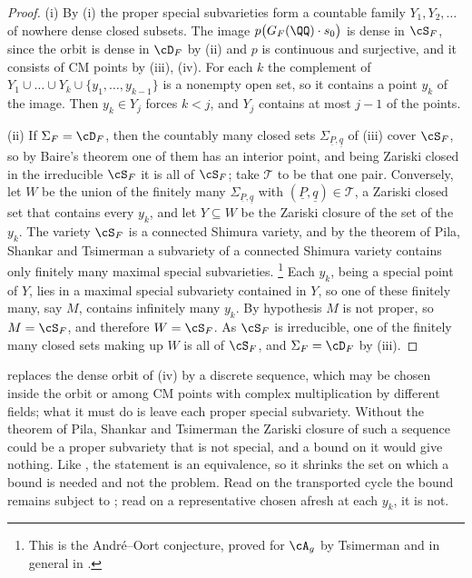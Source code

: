 \begin{proof}
(i) By (i) the proper special subvarieties form a
countable family $Y_{1},Y_{2},\dots$ of nowhere dense closed subsets. The
image $p\bigl(G_{F}(\QQ)\cdot s_{0}\bigr)$ is dense in $\cS_{F}$, since the
orbit is dense in $\cD_{F}$ by (ii) and $p$ is
continuous and surjective, and it consists of CM points by
(iii), (iv). For each $k$ the complement of
$Y_{1}\cup\dots\cup Y_{k}\cup\{y_{1},\dots,y_{k-1}\}$ is a nonempty open set,
so it contains a point $y_{k}$ of the image. Then $y_{k}\in Y_{j}$ forces
$k<j$, and $Y_{j}$ contains at most $j-1$ of the points.

(ii) If $\Sigma_{F}=\cD_{F}$, then the countably many closed sets
$\Sigma_{\underline{P},\underline{q}}$ of (iii) cover
$\cS_{F}$, so by Baire's theorem one of them has an interior point, and being
Zariski closed in the irreducible $\cS_{F}$ it is all of $\cS_{F}$; take
$\mathcal{T}$ to be that one pair. Conversely, let $W$ be the union of the
finitely many $\Sigma_{\underline{P},\underline{q}}$ with
$(\underline{P},\underline{q})\in\mathcal{T}$, a Zariski closed set that
contains every $y_{k}$, and let $Y\subseteq W$ be the Zariski closure of the
set of the $y_{k}$. The variety $\cS_{F}$ is a connected Shimura variety,
and by the theorem of Pila, Shankar and Tsimerman
\cite[Theorem~1.1]{PST} a subvariety of a connected Shimura variety contains
only finitely many maximal special subvarieties.%
\footnote{This is the Andr\'e--Oort conjecture, proved for $\cA_{g}$ by
Tsimerman \cite{Tsi18} and in general in \cite{PST}.}
Each $y_{k}$, being a special point of $Y$, lies in a maximal special
subvariety contained in $Y$, so one of these finitely many, say $M$,
contains infinitely many $y_{k}$. By hypothesis $M$ is not proper, so
$M=\cS_{F}$, and therefore $W=\cS_{F}$. As $\cS_{F}$ is irreducible, one of
the finitely many closed sets making up $W$ is all of $\cS_{F}$, and
$\Sigma_{F}=\cD_{F}$ by (iii).
\end{proof}

\begin{remark}\label{rem:escape}
 replaces the dense orbit of (iv)
by a discrete sequence, which may be chosen inside the orbit or among CM
points with complex multiplication by different fields; what it must do is
leave each proper special subvariety. Without the theorem of Pila, Shankar
and Tsimerman the Zariski closure of such a sequence could be a proper
subvariety that is not special, and a bound on it would give nothing. Like
, the statement is an equivalence, so it shrinks the
set on which a bound is needed and not the problem. Read on the transported
cycle the bound remains subject to ; read on a
representative chosen afresh at each $y_{k}$, it is not.
\end{remark}

